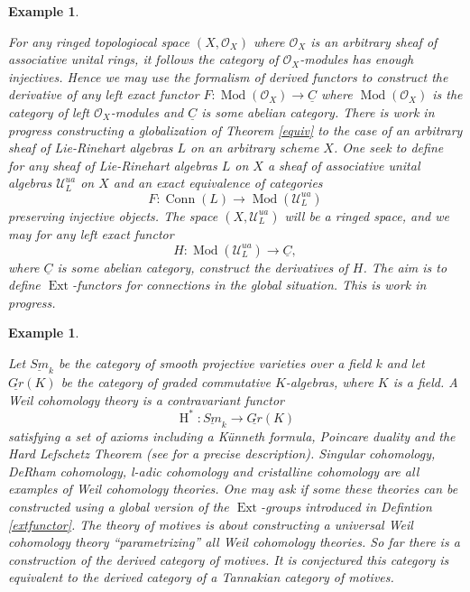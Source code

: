 \documentclass{amsart}
\theoremstyle{plain}
\newtheorem{example}[theorem]{Example}
\theoremstyle{definition}
\theoremstyle{remark}
\numberwithin{equation}{theorem}
\begin{document}
\begin{example}\label{globalext}

For any ringed topologiocal space $(X, {\mathcal{O} }_X)$ where ${\mathcal{O} }_X$ is an arbitrary sheaf of associative unital rings, 
it follows the category of ${\mathcal{O} }_X$-modules has enough injectives. Hence we may use the formalism of derived functors
to construct the derivative of any left exact functor $F:{\operatorname{Mod}}({\mathcal{O} }_X)\rightarrow \underline{C}$ where
${\operatorname{Mod}}({\mathcal{O} }_X)$ is the category of left ${\mathcal{O} }_X$-modules and $\underline{C}$ is some abelian category.
There is work in progress constructing a globalization of Theorem \ref{equiv} to the case of an arbitrary
sheaf of Lie-Rinehart algebras $L$ on an arbitrary scheme $X$. One seek to define for any sheaf of Lie-Rinehart algebras $L$
on $X$ a sheaf of associative unital algebras $\mathcal{U}^{ua}_L$ on $X$ and an exact equivalence of categories
\[ F:{\operatorname{Conn}}(L)\rightarrow {\operatorname{Mod}}(\mathcal{U}_L^{ua}) \]
preserving injective objects. The space $(X, \mathcal{U}_L^{ua})$ will be a ringed space, and we may for any left exact
functor
\[ H: {\operatorname{Mod}}(\mathcal{U}_L^{ua})\rightarrow \underline{C}, \]
where $\underline{C}$ is some abelian category, construct the derivatives of $H$. 
The aim is to define ${\operatorname{Ext} }$-functors for connections in the global situation. This is work in progress.
\end{example}

\begin{example}\label{motives}

Let $\underline{Sm}_k$ be the category of smooth projective varieties over a field $k$ and let 
$\underline{Gr}(K)$ be the category of graded commutative $K$-algebras, where $K$ is a field.
A \emph{Weil cohomology theory} is a contravariant functor
\[ {\operatorname{H} }^*:\underline{Sm}_k\rightarrow \underline{Gr}(K) \]
satisfying a set of axioms including a K\"{u}nneth formula, Poincare duality and the Hard Lefschetz Theorem 
(see \cite{milne} for a precise description). Singular cohomology, DeRham cohomology, 
l-adic cohomology and cristalline cohomology are all examples of Weil cohomology theories.
One may ask if some these theories can be constructed using a global version of the ${\operatorname{Ext} }$-groups introduced in 
Defintion \ref{extfunctor}.
The theory of \emph{motives} is about constructing a \emph{universal Weil cohomology theory} ``parametrizing''
all Weil cohomology theories.
So far there is a construction of the derived category of motives. It is conjectured this category is equivalent
to the derived category of a Tannakian category of motives. 
\end{example}
\end{document}
